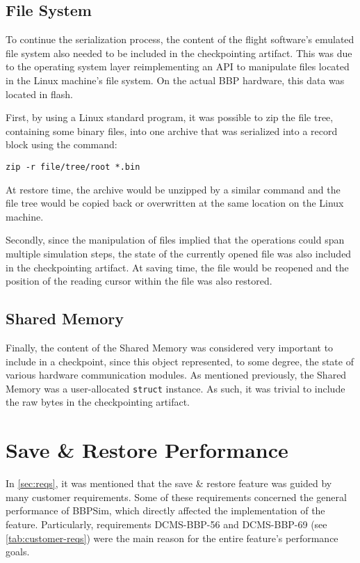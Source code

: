 {\subsection*{File System}
To continue the serialization process, the content of the flight software's emulated file system also needed to be included in the checkpointing artifact. This was due to the operating system layer reimplementing an API to manipulate files located in the Linux machine's file system. On the actual \gls{BBP} hardware, this data was located in flash.

First, by using a Linux standard program, it was possible to zip the file tree, containing some binary files, into one archive that was serialized into a record block using the command:
\begin{verbatim}
zip -r file/tree/root *.bin
\end{verbatim}
At restore time, the archive would be unzipped by a similar command and the file tree would be copied back or overwritten at the same location on the Linux machine.

Secondly, since the manipulation of files implied that the operations could span multiple simulation steps, the state of the currently opened file was also included in the checkpointing artifact. At saving time, the file would be reopened and the position of the reading cursor within the file was also restored. 

\subsection*{Shared Memory}
Finally, the content of the Shared Memory was considered very important to include in a checkpoint, since this object represented, to some degree, the state of various hardware communication modules. As mentioned previously, the Shared Memory was a user-allocated \texttt{struct} instance. As such, it was trivial to include the raw bytes in the checkpointing artifact.  

\section{Save \& Restore Performance}
In \autoref{sec:reqs}, it was mentioned that the save \& restore feature was guided by many customer requirements. Some of these requirements concerned the general performance of BBPSim, which directly affected the implementation of the feature. Particularly, requirements DCMS-BBP-56 and DCMS-BBP-69 (see \autoref{tab:customer-reqs}) were the main reason for the entire feature's performance goals.

}
